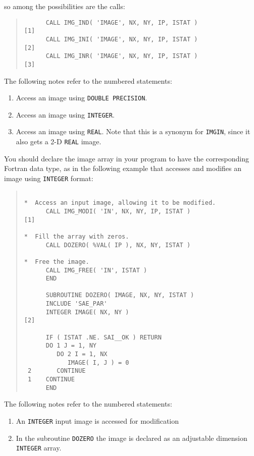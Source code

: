 \documentclass[twoside,11pt]{article}
\newcommand{\htmlref}[2]{#1}
\renewcommand{\_}{\texttt{\symbol{95}}}
\newcommand{\myverb}[1]{{\texttt{#1}}}
\newcommand{\mynote}{The following notes refer to the numbered statements:}
\newenvironment{code}{\begin{small} \begin{quote}}
                     {\end{quote} \end{small}}
\newenvironment{enumnotes}
{
   \renewcommand{\labelenumi}{\myverb{[\theenumi]}}
   \begin{enumerate}
}{
   \end{enumerate}
   \renewcommand{\labelenumi}{\theenumi}
}
\renewenvironment{enumnotes}
  {
    \begin{enumerate}
  }{
    \end{enumerate}
  }
\begin{document}
so among the possibilities are the calls:
\begin{code}
\begin{verbatim}
      CALL IMG_IND( 'IMAGE', NX, NY, IP, ISTAT )              [1]
      CALL IMG_INI( 'IMAGE', NX, NY, IP, ISTAT )              [2]
      CALL IMG_INR( 'IMAGE', NX, NY, IP, ISTAT )              [3]
\end{verbatim}
\end{code}
\mynote
\begin{enumnotes}
\item Access an image using \myverb{DOUBLE PRECISION}.

\item Access an image using \myverb{INTEGER}.

\item Access an image using \myverb{REAL}. Note that
this is a synonym for \htmlref{\myverb{IMG\_IN}}{IMG_INnx}, since it also gets a 2-D
\myverb{REAL} image.
\end{enumnotes}

You should declare the image array in your program to have the
corresponding Fortran data type, as in the following example that
accesses and modifies an image using \myverb{INTEGER} format:
\begin{code}
\begin{verbatim}

*  Access an input image, allowing it to be modified.
      CALL IMG_MODI( 'IN', NX, NY, IP, ISTAT )                [1]

*  Fill the array with zeros.
      CALL DOZERO( %VAL( IP ), NX, NY, ISTAT )

*  Free the image.
      CALL IMG_FREE( 'IN', ISTAT )
      END

      SUBROUTINE DOZERO( IMAGE, NX, NY, ISTAT )
      INCLUDE 'SAE_PAR'
      INTEGER IMAGE( NX, NY )                                 [2]

      IF ( ISTAT .NE. SAI__OK ) RETURN
      DO 1 J = 1, NY
         DO 2 I = 1, NX
            IMAGE( I, J ) = 0
 2       CONTINUE
 1    CONTINUE
      END
\end{verbatim}
\end{code}
\mynote
\begin{enumnotes}
\item An \myverb{INTEGER} input image is accessed for modification

\item In the subroutine \myverb{DOZERO} the image is declared as an
adjustable dimension \myverb{INTEGER} array.
\end{enumnotes}
\end{document}
